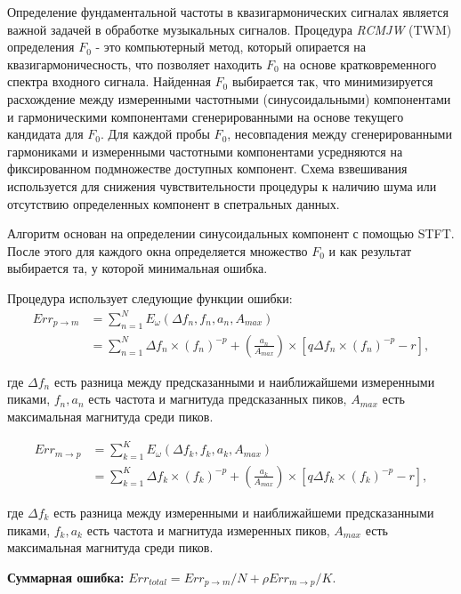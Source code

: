 Определение фундаментальной частоты в квазигармонических сигналах
является важной задачей в обработке музыкальных сигналов.
Процедура \textit{RCMJW} (TWM) определения $F_0$ -
это компьютерный метод, который опирается на квазигармоничесность,
что позволяет находить $F_0$ на основе кратковременного спектра входного
сигнала.
Найденная $F_0$ выбирается так, что минимизируется расхождение между
измеренными частотными (синусоидальными) компонентами и гармоническими
компонентами сгенерированными на основе текущего кандидата для $F_0$.
Для каждой пробы $F_0$, несовпадения между сгенерированными гармониками
и измеренными частотными компонентами усредняются на фиксированном
подмножестве доступных компонент. Схема взвешивания используется для
снижения чувствительности процедуры к наличию шума или отсутствию
определенных компонент в спетральных данных.

Алгоритм основан на определении синусоидальных компонент с помощью STFT.
После этого для каждого окна определяется множество $F_0$ и как результат
выбирается та, у которой минимальная ошибка.

Процедура использует следующие функции ошибки:
\begin{align}
  Err_{p \to m} &= \sum_{n=1}^N E_\omega (\Delta f_n, f_n, a_n, A_{max}) \\
                &= \sum_{n=1}^N \Delta f_n \times (f_n) ^{-p} +
                       (\frac{a_n}{A_{max}}) \times [q \Delta f_n \times
                       (f_n)^{-p} - r],
\end{align}

где $\Delta f_n$ есть разница между предсказанными и наиближайшеми измеренными
пиками, $f_n, a_n$ есть частота и магнитуда предсказанных пиков,
$A_{max}$ есть максимальная магнитуда среди пиков.

\begin{align}
  Err_{m \to p} &= \sum_{k=1}^K E_\omega (\Delta f_k, f_k, a_k, A_{max}) \\
                &= \sum_{k=1}^K \Delta f_k \times (f_k) ^{-p} +
                       (\frac{a_k}{A_{max}}) \times [q \Delta f_k \times
                       (f_k)^{-p} - r],
\end{align}

где $\Delta f_k$ есть разница между измеренными и наиближайшеми предсказанными
пиками, $f_k, a_k$ есть частота и магнитуда измеренных пиков,
$A_{max}$ есть максимальная магнитуда среди пиков.

\textbf{Суммарная ошибка:} $Err_{total} = Err_{p \to m}/N + \rho Err_{m \to p}/K$.

